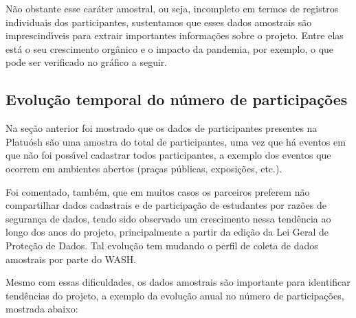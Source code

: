 \documentclass[
12pt,		%
openright,	%
twoside,  %
a4paper,			%
chapter=TITLE,		%
english,			%
french,				%
spanish,			%
brazil				%
]{USPSC-classe/USPSC_RedarTex}
\begin{document}
N\~ao obstante esse car\'ater amostral, ou seja, incompleto em termos de registros individuais dos participantes, sustentamos que esses dados amostrais s\~ao imprescind\'{\i}veis para extrair importantes informa\c{c}\~oes sobre o projeto. Entre elas est\'a o seu crescimento org\^anico e o impacto da pandemia, por exemplo, o que pode ser verificado no gr\'afico a seguir.








\subsection[Evolu\c{c}\~ao temporal do n\'umero de participa\c{c}\~oes]{Evolu\c{c}\~ao temporal do n\'umero de participa\c{c}\~oes}\label{Evolu\c{c}\~ao temporal do n\'umero de participa\c{c}\~oes}
Na se\c{c}\~ao anterior foi mostrado que os dados de participantes presentes na Platu\'osh s\~ao uma amostra do total de participantes, uma vez que h\'a eventos em que n\~ao foi poss\'{\i}vel cadastrar todos participantes, a exemplo dos eventos que ocorrem em ambientes abertos (pra\c{c}as p\'ublicas, exposi\c{c}\~oes, etc.).








Foi comentado, tamb\'em, que em muitos casos os parceiros preferem n\~ao compartilhar dados cadastrais e de participa\c{c}\~ao de estudantes por raz\~oes de seguran\c{c}a de dados, tendo sido observado um crescimento nessa tend\^encia ao longo dos anos do projeto, principalmente a partir da edi\c{c}\~ao da Lei Geral de Prote\c{c}\~ao de Dados. Tal evolu\c{c}\~ao tem mudando o perfil de coleta de dados amostrais por parte do WASH.








Mesmo com essas dificuldades, os dados amostrais s\~ao importante para identificar tend\^encias do projeto, a exemplo da evolu\c{c}\~ao anual no n\'umero de participa\c{c}\~oes, mostrada abaixo:
\end{document}
